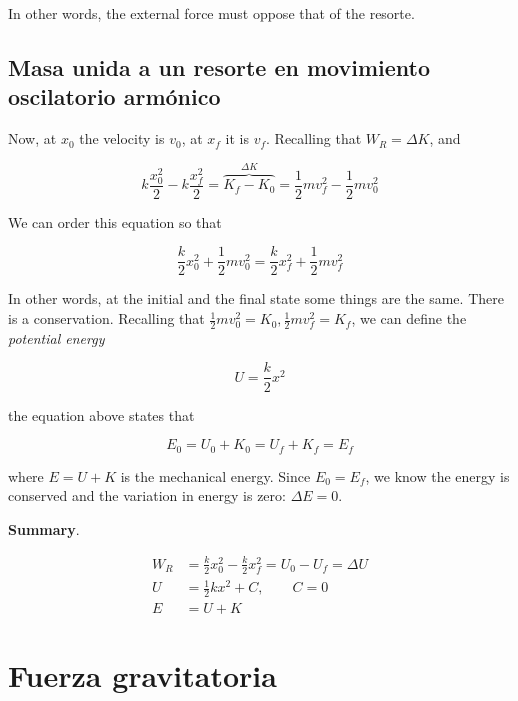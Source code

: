 \documentclass[12pt]{article}
\theoremstyle{definition}
\begin{document}
In other words, the external force must oppose that of the resorte. 

\subsection{Masa unida a un resorte en movimiento oscilatorio armónico}

Now, at $x_0$ the velocity is $v_0$, at $x_f$ it is $v_f$. Recalling that 
$W_R = \Delta K$, and 

\begin{equation*}
    k \frac{x_0^2}{2} - k \frac{x_f^2}{2} = \overbrace{K_f - K_0}^{\Delta K} = \frac{1}{2} m v_f^2 -
    \frac{1}{2}m v_0^2
\end{equation*}

We can order this equation so that 

\begin{equation*}
    \frac{k}{2} x_0^2 + \frac{1}{2}m v_0^2 = \frac{k}{2}x_f^2 + \frac{1}{2}m
    v_f^2
\end{equation*}

In other words, at the initial and the final state some things are the same.
There is a conservation. Recalling that $\frac{1}{2}m v_0^2 = K_0,
\frac{1}{2}mv^2_f = K_f$, we can define the \textit{potential energy}

\begin{equation*}
    U = \frac{k}{2}x^2
\end{equation*}

the equation above states that 

\begin{equation}
    E_0 = U_0 + K_0 = U_f + K_f = E_f
\end{equation}

where $E = U+ K$ is the mechanical energy. Since $E_0 = E_f$, we know the energy
is conserved and the variation in energy is zero: $\Delta E = 0$.

\begin{shaded}
    \textbf{Summary}. 

    \begin{align}
        W_R &= \frac{k}{2}x_0^2 - \frac{k}{2} x_f^2 = U_0 - U_f = \Delta U\\ 
        U &= \frac{1}{2} k x^2 + C, \qquad C = 0 \\ 
        E &= U + K
    \end{align}
\end{shaded}


\section{Fuerza gravitatoria}
\end{document}
